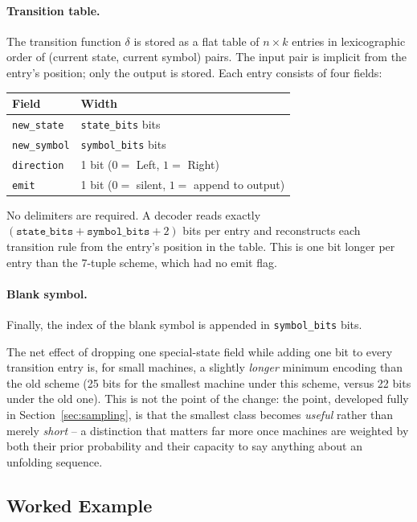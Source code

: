 \documentclass[11pt]{article}
\begin{document}
\paragraph{Transition table.} The transition function $\delta$ is stored as a flat table
of $n \times k$ entries in lexicographic order of (current state, current symbol) pairs.
The input pair is implicit from the entry's position; only the output is stored. Each
entry consists of four fields:
\begin{center}
\begin{tabular}{ll}
  \toprule
  Field & Width \\
  \midrule
  \texttt{new\_state}  & \texttt{state\_bits} bits \\
  \texttt{new\_symbol} & \texttt{symbol\_bits} bits \\
  \texttt{direction}   & 1 bit ($0 = $ Left, $1 = $ Right) \\
  \texttt{emit}         & 1 bit ($0 = $ silent, $1 = $ append to output) \\
  \bottomrule
\end{tabular}
\end{center}
No delimiters are required. A decoder reads exactly
$(\texttt{state\_bits} + \texttt{symbol\_bits} + 2)$ bits per entry and reconstructs each
transition rule from the entry's position in the table. This is one bit longer per entry
than the 7-tuple scheme, which had no emit flag.

\paragraph{Blank symbol.} Finally, the index of the blank symbol is appended in
\texttt{symbol\_bits} bits.

The net effect of dropping one special-state field while adding one bit to every
transition entry is, for small machines, a slightly \emph{longer} minimum encoding than
the old scheme (25 bits for the smallest machine under this scheme, versus 22 bits under
the old one). This is not the point of the change: the point, developed fully in
Section~\ref{sec:sampling}, is that the smallest class becomes \emph{useful} rather than
merely \emph{short} -- a distinction that matters far more once machines are weighted by
both their prior probability and their capacity to say anything about an unfolding
sequence.

\subsection{Worked Example}
\label{sec:encoding-example}
\end{document}
